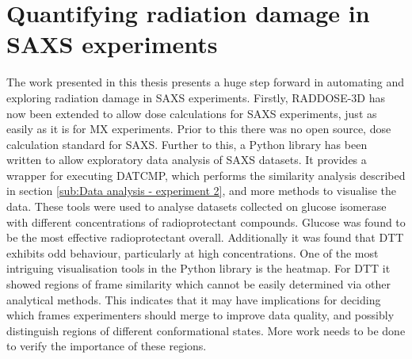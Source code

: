 \section{Quantifying radiation damage in SAXS experiments}
\label{sec:Quantifying radiation damage in SAXS experiments}
The work presented in this thesis presents a huge step forward in automating and exploring radiation damage in SAXS experiments.
Firstly, RADDOSE-3D has now been extended to allow dose calculations for SAXS experiments, just as easily as it is for MX experiments.
Prior to this there was no open source, dose calculation standard for SAXS.
Further to this, a Python library has been written to allow exploratory data analysis of SAXS datasets.
It provides a wrapper for executing DATCMP, which performs the similarity analysis described in section \ref{sub:Data analysis - experiment 2}, and more methods to visualise the data.
These tools were used to analyse datasets collected on glucose isomerase with different concentrations of radioprotectant compounds.
Glucose was found to be the most effective radioprotectant overall.
Additionally it was found that DTT exhibits odd behaviour, particularly at high concentrations.
One of the most intriguing visualisation tools in the Python library is the heatmap.
For DTT it showed regions of frame similarity which cannot be easily determined via other analytical methods.
This indicates that it may have implications for deciding which frames experimenters should merge to improve data quality, and possibly distinguish regions of different conformational states.
More work needs to be done to verify the importance of these regions.
